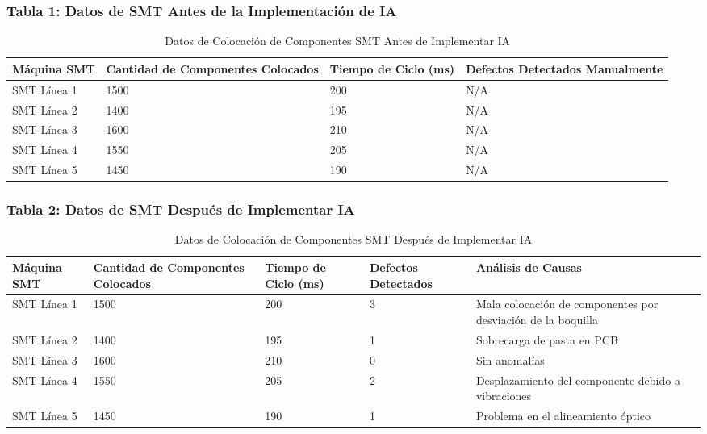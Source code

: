 \subsubsection*{Tabla 1: Datos de SMT Antes de la Implementación de IA}

\begin{table}[htbp]
\centering
\caption{Datos de Colocación de Componentes SMT Antes de Implementar IA}
\label{tab:antes-ia-smt}
\begin{tabularx}{\textwidth}{|X|X|X|X|}
\hline
\textbf{Máquina SMT} & \textbf{Cantidad de Componentes Colocados} & \textbf{Tiempo de Ciclo (ms)} & \textbf{Defectos Detectados Manualmente} \\
\hline
SMT Línea 1 & 1500 & 200 & N/A \\
\hline
SMT Línea 2 & 1400 & 195 & N/A \\
\hline
SMT Línea 3 & 1600 & 210 & N/A \\
\hline
SMT Línea 4 & 1550 & 205 & N/A \\
\hline
SMT Línea 5 & 1450 & 190 & N/A \\
\hline
\end{tabularx}
\end{table}

\subsubsection*{Tabla 2: Datos de SMT Después de Implementar IA}

\begin{table}[htbp]
\centering
\caption{Datos de Colocación de Componentes SMT Después de Implementar IA}
\label{tab:despues-ia-smt}
\begin{tabularx}{\textwidth}{|X|X|X|X|X|}
\hline
\textbf{Máquina SMT} & \textbf{Cantidad de Componentes Colocados} & \textbf{Tiempo de Ciclo (ms)} & \textbf{Defectos Detectados} & \textbf{Análisis de Causas} \\
\hline
SMT Línea 1 & 1500 & 200 & 3 & Mala colocación de componentes por desviación de la boquilla \\
\hline
SMT Línea 2 & 1400 & 195 & 1 & Sobrecarga de pasta en PCB \\
\hline
SMT Línea 3 & 1600 & 210 & 0 & Sin anomalías \\
\hline
SMT Línea 4 & 1550 & 205 & 2 & Desplazamiento del componente debido a vibraciones \\
\hline
SMT Línea 5 & 1450 & 190 & 1 & Problema en el alineamiento óptico \\
\hline
\end{tabularx}
\end{table}

